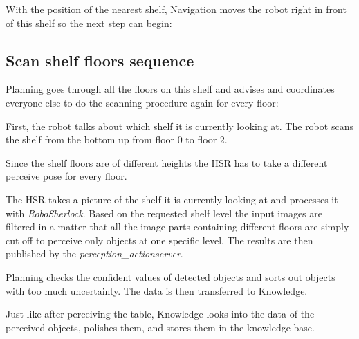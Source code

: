 \documentclass[main.tex]{subfiles}
\begin{document}
	\begin{navigation}
	With the position of the nearest shelf, Navigation moves the robot right in front of this shelf so the next step can begin:
	\end{navigation}
	
	\subsection{Scan shelf floors sequence}
	
	\begin{planning}
	Planning goes through all the floors on this shelf and advises and coordinates everyone else to do the scanning procedure again for every floor:
	\end{planning}
	\begin{nlp}
	First, the robot talks about which shelf it is currently looking at. The robot scans the shelf from the bottom up from floor 0 to floor 2.\end{nlp}
	
	\begin{manipulation}
	Since the shelf floors are of different heights the HSR has to take a different perceive pose for every floor.
	\end{manipulation}
	
	\begin{perception}
	The HSR takes a picture of the shelf it is currently looking at and processes it with \textit{RoboSherlock}. Based on the requested shelf level the input images are filtered in a matter that all the image parts containing different floors are simply cut off to perceive only objects at one specific level. The results are then published by the \textit{perception\_actionserver}.
	\end{perception}
	
	\begin{planning}
	Planning checks the confident values of detected objects and sorts out objects with too much uncertainty. The data is then transferred to Knowledge.
	\end{planning}
	
	\begin{knowledge}
	Just like after perceiving the table, Knowledge looks into the data of the perceived objects, polishes them, and stores them in the knowledge base.
	\end{knowledge}
	
\end{document}
